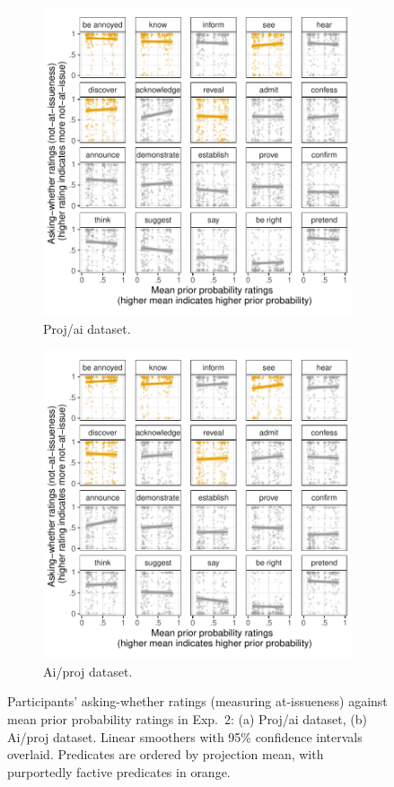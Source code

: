 \documentclass[11pt,fleqn]{article}
\newcommand{\6}{\mbox{$[\hspace*{-.6mm}[$}}
\newcommand{\9}{\mbox{$]\hspace*{-.6mm}]$}}
\begin{document}
\begin{figure}[h!]
\centering
\begin{subfigure}[t]{0.49\textwidth}
\centering
\includegraphics[width=.9\textwidth]{../../results/exp2/graphs/SUP-projai-ai-by-prior}
\caption{Proj/ai dataset.}
\end{subfigure} \hfill \begin{subfigure}[t]{0.49\textwidth}
\centering
\includegraphics[width=.9\textwidth]{../../results/exp2/graphs/SUP-aiproj-ai-by-prior}
\caption{Ai/proj dataset.}
 \end{subfigure}
 
  
\caption{Participants' asking-whether ratings (measuring at-issueness) against mean prior probability ratings in Exp.~2: (a) Proj/ai dataset, (b) Ai/proj dataset. Linear smoothers with 95\% confidence intervals overlaid. Predicates are ordered by projection mean, with purportedly factive predicates in orange.}
\end{figure}
\end{document}
